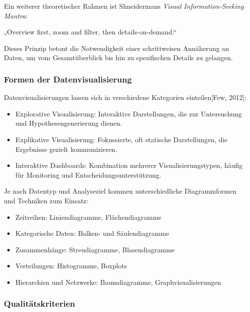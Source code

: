 Ein weiterer theoretischer Rahmen ist Shneidermans \textit{Visual Information-Seeking Mantra}:



„Overview first, zoom and filter, then details-on-demand.“

Dieses Prinzip betont die Notwendigkeit einer schrittweisen Annäherung an Daten, um vom Gesamtüberblick bis hin zu spezifischen Details zu gelangen.


\subsubsection{Formen der Datenvisualisierung}

Datenvisualisierungen lassen sich in verschiedene Kategorien einteilen[Few, 2012]:

\begin{itemize}

\item
Explorative Visualisierung: Interaktive Darstellungen, die zur Untersuchung und Hypothesengenerierung dienen.
\item
Explikative Visualisierung: Fokussierte, oft statische Darstellungen, die Ergebnisse gezielt kommunizieren.
\item
Interaktive Dashboards: Kombination mehrerer Visualisierungstypen, häufig für Monitoring und Entscheidungsunterstützung.

\end{itemize}

Je nach Datentyp und Analyseziel kommen unterschiedliche Diagrammformen und Techniken zum Einsatz:

\begin{itemize}

\item
Zeitreihen: Liniendiagramme, Flächendiagramme
\item
Kategorische Daten: Balken- und Säulendiagramme
\item
Zusammenhänge: Streudiagramme, Blasendiagramme
\item
Verteilungen: Histogramme, Boxplots
\item
Hierarchien und Netzwerke: Baumdiagramme, Graphvisualisierungen

\end{itemize}

\subsubsection{Qualitätskriterien}

